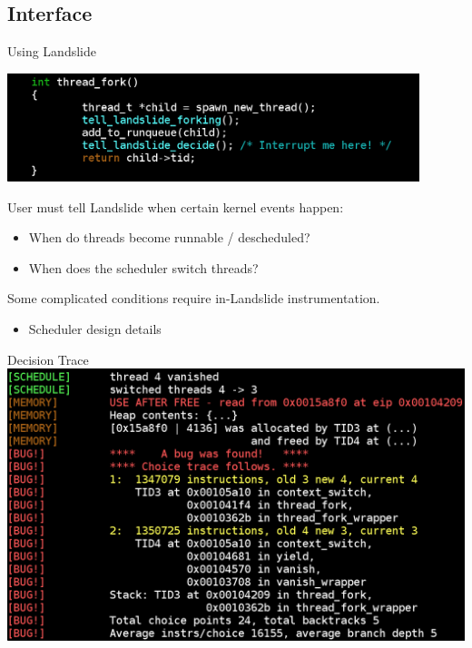 \documentclass[xcolor=dvipsnames]{beamer}
\begin{document}
\subsection{Interface}

\begin{frame}{Using Landslide}
	\begin{center}
	\includegraphics[width=0.9\textwidth]{tell_landslide.png}
	\end{center}
	User must tell Landslide when certain kernel events happen:
	\begin{itemize}
		\item When do threads become runnable / descheduled?
		\item When does the scheduler switch threads?
	\end{itemize}
	\linegap
	Some complicated conditions require in-Landslide instrumentation.
	\begin{itemize}
		\item Scheduler design details
	\end{itemize}
\end{frame}

\begin{frame}{Decision Trace}
	\includegraphics[width=\textwidth]{found_a_bug.png}
\end{frame}

\end{document}
